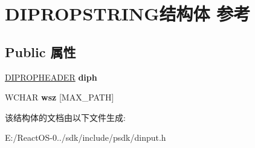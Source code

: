 \hypertarget{struct_d_i_p_r_o_p_s_t_r_i_n_g}{}\section{D\+I\+P\+R\+O\+P\+S\+T\+R\+I\+N\+G结构体 参考}
\label{struct_d_i_p_r_o_p_s_t_r_i_n_g}
\subsection*{Public 属性}
\begin{DoxyCompactItemize}
\item 
\mbox{\label{struct_d_i_p_r_o_p_s_t_r_i_n_g_adb14b72ea37aef67d3675bc5a129728b}} 
\hyperlink{struct_d_i_p_r_o_p_h_e_a_d_e_r}{D\+I\+P\+R\+O\+P\+H\+E\+A\+D\+ER} {\bfseries diph}
\item 
\mbox{\label{struct_d_i_p_r_o_p_s_t_r_i_n_g_afdd1b93fcbde08028e3891c233708af6}} 
W\+C\+H\+AR {\bfseries wsz} \mbox{[}M\+A\+X\+\_\+\+P\+A\+TH\mbox{]}
\end{DoxyCompactItemize}


该结构体的文档由以下文件生成\+:\begin{DoxyCompactItemize}
\item 
E\+:/\+React\+O\+S-\/0../sdk/include/psdk/dinput.\+h\end{DoxyCompactItemize}
